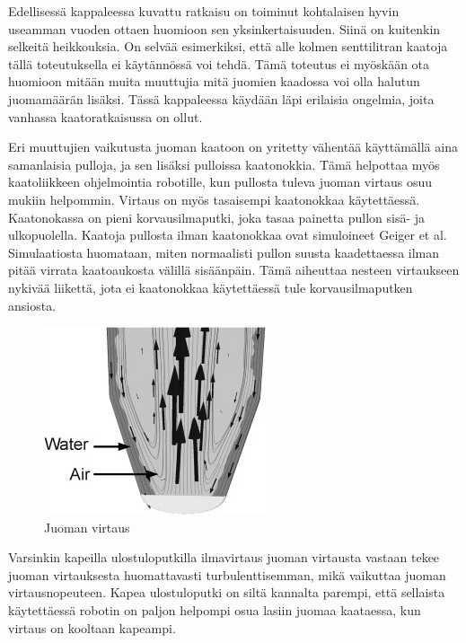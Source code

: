 Edellisessä kappaleessa kuvattu ratkaisu on toiminut kohtalaisen hyvin useamman vuoden ottaen huomioon sen yksinkertaisuuden. Siinä on kuitenkin selkeitä heikkouksia. On selvää esimerkiksi, että alle kolmen senttilitran kaatoja tällä toteutuksella ei käytännössä voi tehdä. Tämä toteutus ei myöskään ota huomioon mitään muita muuttujia mitä juomien kaadossa voi olla halutun juomamäärän lisäksi. Tässä kappaleessa käydään läpi erilaisia ongelmia, joita vanhassa kaatoratkaisussa on ollut.

Eri muuttujien vaikutusta juoman kaatoon on yritetty vähentää käyttämällä aina samanlaisia pulloja, ja sen lisäksi pulloissa kaatonokkia. Tämä helpottaa myös kaatoliikkeen ohjelmointia robotille, kun pullosta tuleva juoman virtaus osuu mukiin helpommin. Virtaus on myös tasaisempi kaatonokkaa käytettäessä. Kaatonokassa on pieni korvausilmaputki, joka tasaa painetta pullon sisä- ja ulkopuolella. Kaatoja pullosta ilman kaatonokkaa ovat simuloineet Geiger et al. Simulaatiosta huomataan, miten normaalisti pullon suusta kaadettaessa ilman pitää virrata kaatoaukosta välillä sisäänpäin. Tämä aiheuttaa nesteen virtaukseen nykivää liikettä, jota ei kaatonokkaa käytettäessä tule korvausilmaputken ansiosta.

\begin{figure}[h]
\begin{center}
\includegraphics[scale=1.1]{img/Geiger et al. juoman virtaus.jpg}
\end{center}
\caption{Juoman virtaus \cite{Geiger2012}}
\label{fig:juomien_virtaus}
\end{figure}

Varsinkin kapeilla ulostuloputkilla ilmavirtaus juoman virtausta vastaan tekee juoman virtauksesta huomattavasti turbulenttisemman, mikä vaikuttaa juoman virtausnopeuteen. \cite{Geiger2012} Kapea ulostuloputki on siltä kannalta parempi, että sellaista käytettäessä robotin on paljon helpompi osua lasiin juomaa kaataessa, kun virtaus on kooltaan kapeampi.


